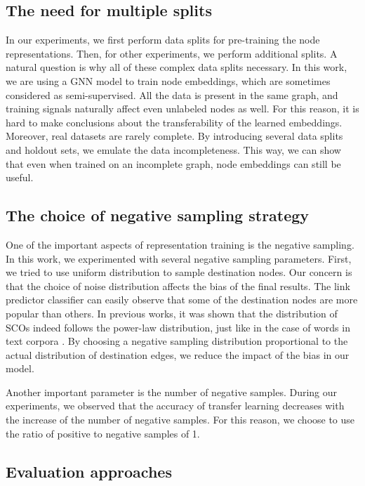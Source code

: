 \documentclass[a4paper,twoside]{article}
\begin{document}
\subsection{The need for multiple splits}

In our experiments, we first perform data splits for pre-training the node representations. Then, for other experiments, we perform additional splits. 
A natural question is why all of these complex data splits necessary. In this work, we are using a GNN model to train node embeddings, which are sometimes considered as semi-supervised. All the data is present in the same graph, and training signals naturally affect even unlabeled nodes as well. For this reason, it is hard to make conclusions about the transferability of the learned embeddings. Moreover, real datasets are rarely complete. By introducing several data splits and holdout sets, we emulate the data incompleteness. This way, we can show that even when trained on an incomplete graph, node embeddings can still be useful.

\subsection{The choice of negative sampling strategy}

One of the important aspects of representation training is the negative sampling. In this work, we experimented with several negative sampling parameters. First, we tried to use uniform distribution to sample destination nodes. Our concern is that the choice of noise distribution affects the bias of the final results. The link predictor classifier can easily observe that some of the destination nodes are more popular than others. In previous works, it was shown that the distribution of SCOs indeed follows the power-law distribution, just like in the case of words in text corpora \cite{Valverde2003}. By choosing a negative sampling distribution proportional to the actual distribution of destination edges, we reduce the impact of the bias in our model. 

Another important parameter is the number of negative samples. During our experiments, we observed that the accuracy of transfer learning decreases with the increase of the number of negative samples. For this reason, we choose to use the ratio of positive to negative samples of 1.

\subsection{Evaluation approaches}
\end{document}

